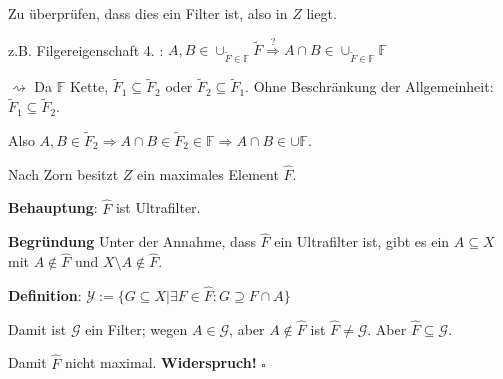 \documentclass[14pt,a4paper]{article}
\begin{document}
			Zu überprüfen, dass dies ein Filter ist, also in $Z$ liegt.\
			
			z.B. Filgereigenschaft 4. : $A,B \in \cup_{\widetilde{F} \in \mathbb{F}} \widetilde{F} \stackrel{?}{\Rightarrow} A \cap B \in \cup_{\tilde{F} \in \mathbb{F}} \mathbb{F}$

			$\rightsquigarrow$ Da $\mathbb{F}$ Kette,  $\tilde{F}_1 \subseteq \tilde{F}_2$ oder $\tilde{F}_2 \subseteq \tilde{F}_1$.
			Ohne Beschränkung der Allgemeinheit: $\tilde{F}_1 \subseteq \tilde{F}_2$.

			Also $A,B \in \tilde{F}_2 \Rightarrow A \cap B \in \tilde{F}_2 \in \mathbb{F} \Rightarrow A \cap B \in \cup \mathbb{F}$.

			Nach Zorn besitzt $Z$ ein maximales Element $\hat{F}$.

			\textbf{Behauptung}: $\hat{F}$ ist Ultrafilter.

			\textbf{Begründung}
			Unter der Annahme, dass $\hat{F}$ ein Ultrafilter ist, gibt es ein $A \subseteq X$ mit $A \notin \hat{F}$ und $X \setminus A \notin \hat{F}$.
			
			\textbf{Definition}:
			$\mathscr{Y} := \{ G \subseteq X | \exists F \in \hat{F} : G \supseteq F \cap A\}$

			Damit ist $\mathscr{G}$ ein Filter; wegen $A \in \mathscr{G}$, aber $A \notin \hat{F}$ ist $\hat{F} \neq \mathscr{G}$.
			Aber $\hat{F} \subseteq \mathscr{G}$.

			Damit $\hat{F}$ nicht maximal. \textbf{Widerspruch!}
			$\square$
\end{document}
